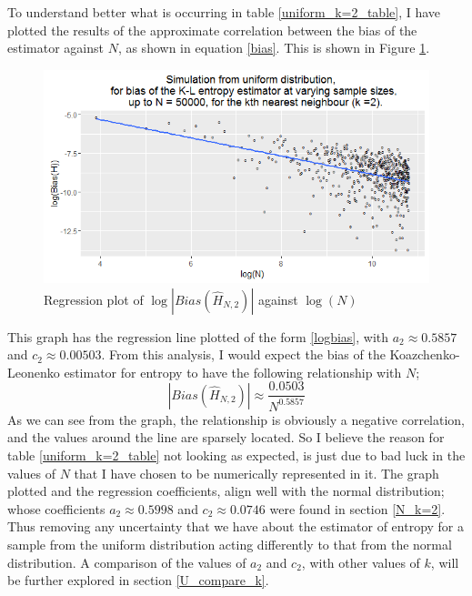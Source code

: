\documentclass{report}
\begin{document}
To understand better what is occurring in table \ref{uniform_k=2_table}, I have plotted the results of the approximate correlation between the bias of the estimator against $N$, as shown in equation \ref{bias}. This is shown in Figure \ref{uniform_k=2_graph}.

\begin{figure}
  \begin{center}
    \includegraphics[width=\textwidth]{./Graphs/Uniform_k=2_plot.png}
  \end{center}
\caption{Regression plot of $\log|Bias(\hat{H}_{N, 2})|$ against $\log(N)$}
  \label{uniform_k=2_graph}
\end{figure}

This graph has the regression line plotted of the form \ref{logbias}, with $a_{2} \approx 0.5857$ and $c_{2} \approx 0.00503$. From this analysis, I would expect the bias of the Koazchenko-Leonenko estimator for entropy to have the following relationship with $N$;
\begin{equation}
|Bias(\hat{H}_{N, 2})| \approx \frac{0.0503}{N^{0.5857}}\nonumber
\end{equation}
As we can see from the graph, the relationship is obviously a negative correlation, and the values around the line are sparsely located. So I believe the reason for table \ref{uniform_k=2_table} not looking as expected, is just due to bad luck in the values of $N$ that I have chosen to be numerically represented in it. The graph plotted and the regression coefficients, align well with the normal distribution; whose coefficients $a_{2} \approx 0.5998$ and $c_{2} \approx 0.0746$ were found in section \ref{N_k=2}. Thus removing any uncertainty that we have about the estimator of entropy for a sample from the uniform distribution acting differently to that from the normal distribution. A comparison of the values of $a_{2}$ and $c_{2}$, with other values of $k$, will be further explored in section \ref{U_compare_k}.
\end{document}
